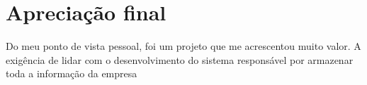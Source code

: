 \section{Apreciação final}
Do meu ponto de vista pessoal, foi um projeto que me acrescentou muito valor. A exigência de lidar com o desenvolvimento do sistema responsável por armazenar toda a informação da empresa 